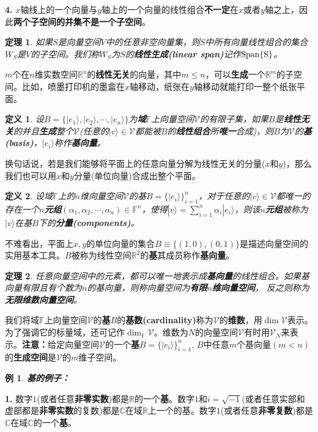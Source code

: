 \documentclass[mathserif,hyperref,UTF8,openany,b5paper]{ctexbook}
\newtheorem{exmp}{例}[section]
\newtheorem{defn}{定义}[section]
\newtheorem{thm}{定理}[section]
\begin{document}
 \textbf{4.} $x$轴线上的一个向量与$y$轴上的一个向量的线性组合\textbf{不一定}在$x$或者$y$轴之上，因此\textbf{两个子空间的并集不是一个子空间}。

\begin{thm}
如果$S$是向量空间$V$中的任意非空向量集，则$S$中所有向量线性组合的集合$W_S$是$V$的子空间。我们称$W_S$为$S$的\textbf{线性生成(linear span)}记作$\rm Span\{S\}$。
\end{thm}

$m$个在$n$维实数空间$\mathbb{R}^n$的\textbf{线性无关}的向量，其中$m\leq n$，可以\textbf{生成}一个$\mathbb{R}^m$的子空间。比如，喷墨打印机的墨盒在$x$轴移动，纸张在$y$轴移动就能打印一整个纸张平面。
\begin{defn}
设$B=\{|e_1\rangle,|e_2\rangle,\cdots,|e_n\rangle\}$为\textbf{域}$\mathbb{F}$上向量空间$\mathcal{V}$的有限子集，如果$B$是\textbf{线性无关}的并且\textbf{生成}整个$\mathcal{V}$(任意的$|v\rangle\in \mathcal{V}$都能被$B$的\textbf{线性组合}所\textbf{唯一}合成)，则$B$为$\mathcal{V}$的\textbf{基(basis)}，$|e_i\rangle$称作\textbf{基向量}。
\end{defn}

换句话说，若是我们能够将平面上的任意向量分解为线性无关的分量($x$和$y$)，那么我们也可以用$x$和$y$分量(单位向量)合成出整个平面。
\begin{defn}
设域$\mathbb{F}$上的$n$维向量空间$\mathcal{V}$的基$B=\{|e_i\rangle\}^n_{i=1}$，对于任意的$|v\rangle\in \mathcal{V}$都唯一的存在一个\textbf{$n$元组}$(\alpha_1,\alpha_2,\cdots,\alpha_n)\in\mathbb{F}^n$，使得$|v\rangle= \sum^n_{i=1}\alpha_i|e_i\rangle$，则该\textbf{$n$元组}被称为$|v\rangle$在基$B$下的\textbf{分量(components)}。
\end{defn}

不难看出，平面上$x,y$的单位向量的集合$B\equiv\{(1,0),(0,1)\}$是描述向量空间的实用基本工具。$B$被称为线性空间$\mathbb{R}^2$的\textbf{基}其成员称作\textbf{基向量}。
\begin{thm}
任意向量空间中的元素，都可以唯一地表示成\textbf{基向量}的线性组合。如果基向量有限且有个数为$n$的基向量，则称向量空间为\textbf{有限$n$维向量空间}， 反之则称为\textbf{无限维数向量空间}。
\end{thm}

我们将域$\mathbb{F}$上向量空间$\mathcal{V}$的\textbf{基}$B$的\textbf{基数(cardinality)}称为$\mathcal{V}$的\textbf{维数}，用$\dim \mathcal{V}$表示。为了强调它的标量域，还可记作$\dim_\mathbb{F} \mathcal{V}$。维数为$N$的向量空间$\mathcal{V}$有时用$\mathcal{V}_N$来表示。\textbf{注意：}给定向量空间$\mathcal{V}$的一个\textbf{基}$B = \{|e_i\rangle\}^n_{i=1}$, $B$中任意$m$个基向量$(m < n)$的\textbf{生成空间}是$\mathcal{V}$的$m$维子空间。
\begin{exmp}\textbf{基的例子：}\end{exmp}
 \textbf{1.} 数字$1$(或者任意\textbf{非零实数})都是$\mathbb{R}$的一个\textbf{基}。数字$1$和$i=\sqrt{-1}$(或者任意实部和虚部都是\textbf{非零实数}的复数)都是$\mathbb{C}$在域$\mathbb{R}$上一个的基。数字$1$(或者任意\textbf{非零复数})都是$\mathbb{C}$在域$\mathbb{C}$的一个\textbf{基}。
\end{document}
